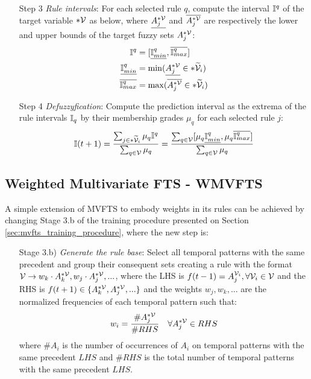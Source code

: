 \begin{enumerate}
\item [Step 3] \textit{Rule intervals}: For each selected rule $q$, compute the interval $\mathbb{I}^q$ of the target variable $*\mathcal{V}$ as below, where $\underline{A_j^{*\mathcal{V}}}$ and $\overline{A_j^{*\mathcal{V}}}$ are respectively the lower and upper bounds of the target fuzzy sets  $A_j^{*\mathcal{V}}$:
\begin{align}
    \mathbb{I}^q & =  [\underline{\mathbb{I}^q_{min}}, \overline{\mathbb{I}^q_{max}}] \\
    \underline{\mathbb{I}^q_{min}} &= \min(\underline{A_j^{*\mathcal{V}}} \in *\widetilde{\mathcal{V}}_i) \\
    \overline{\mathbb{I}^q_{max}} &= \max(\overline{A_j^{*\mathcal{V}}} \in *\widetilde{\mathcal{V}}_i) \\
\end{align}

\item [Step 4] \textit{Defuzzyfication}: Compute the prediction interval as the extrema of the rule intervals $\mathbb{I}_q$ by their membership grades $\mu_q$ for each selected rule $j$:
\begin{equation}
\mathbb{I}(t+1) = \frac{\sum_{j \in *\widetilde{\mathcal{V}}_i} \mu_q \mathbb{I}^q}{\sum_{q \in \mathcal{V}} \mu_q} = \frac{\sum_{q \in \mathcal{V}} [\mu_q\underline{\mathbb{I}^q_{min}} , \mu_q\overline{\mathbb{I}^q_{max}}] }{\sum_{q \in \mathcal{V}} \mu_q}
\label{eqn:mvifts}
\end{equation}
\end{enumerate}

\subsection{Weighted Multivariate FTS - WMVFTS}
\label{sec:wmvfts}

A simple extension of MVFTS to embody weights in its rules can be achieved by changing Stage 3.b of the training procedure presented on Section \ref{sec:mvfts_training_procedure}, where the new step is:

\begin{enumerate}
    \item[Stage 3.b)] \textit{Generate the rule base}: Select all temporal patterns with the same precedent and group their consequent sets  creating a rule with the format $\mathcal{V} \rightarrow w_k \cdot A_k^{*\mathcal{V}}, w_j \cdot A_j^{*\mathcal{V}},...$, where the LHS is $f(t - 1) = A_j^{\mathcal{V}_i}, \forall \mathcal{V}_i \in \mathcal{V}$ and the RHS is $f(t+1) \in \{A_k^{*\mathcal{V}},A_j^{*\mathcal{V}},... \}$ and the weights $w_j, w_k, ...$ are the normalized frequencies of each temporal pattern such that:
\begin{equation}
w_i = \frac{\#A_j^{*\mathcal{V}}}{\#RHS} \quad \forall A_j^{*\mathcal{V}} \in RHS    
\end{equation}
where $\#A_i$ is the number of occurrences of $A_i$ on temporal patterns with the same precedent $LHS$ and $\#RHS$ is the total number of temporal patterns with the same precedent $LHS$.
\end{enumerate}

